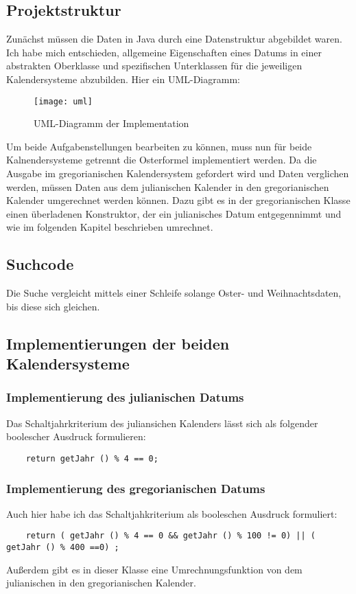 \subsection{Projektstruktur}
Zunächst müssen die Daten in Java durch eine Datenstruktur abgebildet waren. Ich habe mich entschieden, allgemeine Eigenschaften eines Datums in einer abstrakten Oberklasse und spezifischen Unterklassen für die jeweiligen Kalendersysteme abzubilden. Hier ein UML-Diagramm:
\begin{figure}[h]
	\centering
	\texttt{[image: uml]}
	\caption{UML-Diagramm der Implementation}
\end{figure}

Um beide Aufgabenstellungen bearbeiten zu können, muss nun für beide Kalnendersysteme getrennt die Osterformel implementiert werden. Da die Ausgabe im gregorianischen Kalendersystem gefordert wird und Daten verglichen werden, müssen Daten aus dem julianischen Kalender in den gregorianischen Kalender umgerechnet werden können. Dazu gibt es in der gregorianischen Klasse einen überladenen Konstruktor, der ein julianisches Datum entgegennimmt und wie im folgenden Kapitel beschrieben umrechnet.

\subsection{Suchcode}
Die Suche vergleicht mittels einer Schleife solange Oster- und Weihnachtsdaten, bis diese sich gleichen.
\clearpage
\subsection{Implementierungen der beiden Kalendersysteme}
	\subsubsection{Implementierung des julianischen Datums}
	Das Schaltjahrkriterium des juliansichen Kalenders lässt sich als folgender boolescher Ausdruck formulieren:
	\begin{lstlisting}
	return getJahr () % 4 == 0;
	\end{lstlisting}
	\subsubsection{Implementierung des gregorianischen Datums}
	Auch hier habe ich das Schaltjahkriterium als booleschen Ausdruck formuliert:
	\begin{lstlisting}
	return ( getJahr () % 4 == 0 && getJahr () % 100 != 0) || ( getJahr () % 400 ==0) ;
	\end{lstlisting}
	Außerdem gibt es in dieser Klasse eine Umrechnungsfunktion von dem julianischen in den gregorianischen Kalender. 

